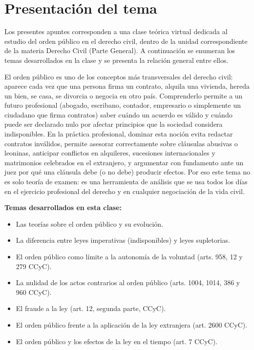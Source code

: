 \documentclass[12pt,oneside]{book}
\begin{document}
\tableofcontents

\chapter*{Presentación del tema}

Los presentes apuntes corresponden a una clase teórica virtual dedicada al estudio del orden público en el derecho civil, dentro de la unidad correspondiente de la materia Derecho Civil (Parte General). A continuación se enumeran los temas desarrollados en la clase y se presenta la relación general entre ellos.

\begin{important}
El orden público es uno de los conceptos más transversales del derecho civil: aparece cada vez que una persona firma un contrato, alquila una vivienda, hereda un bien, se casa, se divorcia o negocia en otro país. Comprenderlo permite a un futuro profesional (abogado, escribano, contador, empresario o simplemente un ciudadano que firma contratos) saber cuándo un acuerdo es válido y cuándo puede ser declarado nulo por afectar principios que la sociedad considera indisponibles. En la práctica profesional, dominar esta noción evita redactar contratos inválidos, permite asesorar correctamente sobre cláusulas abusivas o leoninas, anticipar conflictos en alquileres, sucesiones internacionales y matrimonios celebrados en el extranjero, y argumentar con fundamento ante un juez por qué una cláusula debe (o no debe) producir efectos. Por eso este tema no es solo teoría de examen: es una herramienta de análisis que se usa todos los días en el ejercicio profesional del derecho y en cualquier negociación de la vida civil.
\end{important}

\textbf{Temas desarrollados en esta clase:}

\begin{itemize}
    \item Las teorías sobre el orden público y su evolución.
    \item La diferencia entre leyes imperativas (indisponibles) y leyes supletorias.
    \item El orden público como límite a la autonomía de la voluntad (arts. 958, 12 y 279 CCyC).
    \item La nulidad de los actos contrarios al orden público (arts. 1004, 1014, 386 y 960 CCyC).
    \item El fraude a la ley (art. 12, segunda parte, CCyC).
    \item El orden público frente a la aplicación de la ley extranjera (art. 2600 CCyC).
    \item El orden público y los efectos de la ley en el tiempo (art. 7 CCyC).
\end{itemize}
\end{document}
